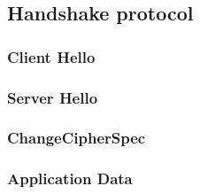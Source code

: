 \subsection{Handshake protocol}


\subsubsection*{Client Hello}

\subsubsection*{Server Hello}

\subsubsection*{ChangeCipherSpec}

\subsubsection*{Application Data}
